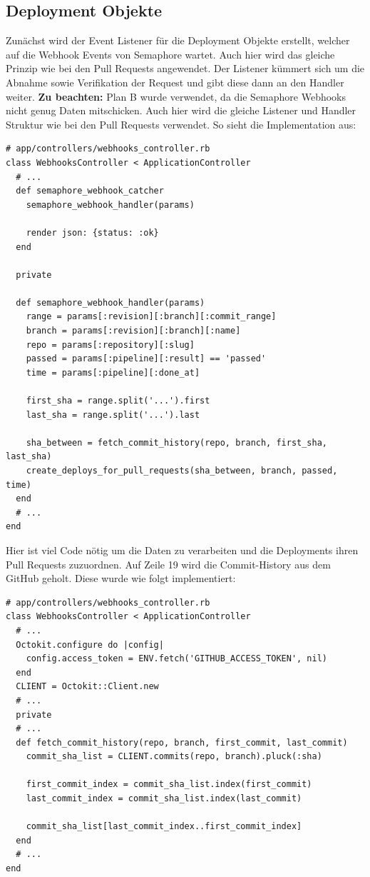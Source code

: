 \subsection{Deployment Objekte}
Zunächst wird der Event Listener für die Deployment Objekte erstellt, welcher auf die Webhook Events von Semaphore
wartet. Auch hier wird das gleiche Prinzip wie bei den Pull Requests angewendet. Der Listener kümmert sich um die
Abnahme sowie Verifikation der Request und gibt diese dann an den Handler weiter. \newline
\textbf{Zu beachten:} Plan B wurde verwendet, da die Semaphore Webhooks nicht genug Daten mitschicken. \newline
Auch hier wird die gleiche Listener und Handler Struktur wie bei den Pull Requests verwendet. So sieht die
Implementation aus:
\begin{codebox}[]
  \begin{verbatim}
# app/controllers/webhooks_controller.rb
class WebhooksController < ApplicationController
  # ...
  def semaphore_webhook_catcher
    semaphore_webhook_handler(params)

    render json: {status: :ok}
  end

  private

  def semaphore_webhook_handler(params)
    range = params[:revision][:branch][:commit_range]
    branch = params[:revision][:branch][:name]
    repo = params[:repository][:slug]
    passed = params[:pipeline][:result] == 'passed'
    time = params[:pipeline][:done_at]

    first_sha = range.split('...').first
    last_sha = range.split('...').last

    sha_between = fetch_commit_history(repo, branch, first_sha, last_sha)
    create_deploys_for_pull_requests(sha_between, branch, passed, time)
  end
  # ...
end
  \end{verbatim}
\end{codebox}
Hier ist viel Code nötig um die Daten zu verarbeiten und die Deployments ihren Pull Requests zuzuordnen. Auf Zeile 19
wird die Commit-History aus dem GitHub geholt. Diese wurde wie folgt implementiert:
\begin{codebox}[]
  \begin{verbatim}
# app/controllers/webhooks_controller.rb
class WebhooksController < ApplicationController
  # ...
  Octokit.configure do |config|
    config.access_token = ENV.fetch('GITHUB_ACCESS_TOKEN', nil)
  end
  CLIENT = Octokit::Client.new
  # ...
  private
  # ...
  def fetch_commit_history(repo, branch, first_commit, last_commit)
    commit_sha_list = CLIENT.commits(repo, branch).pluck(:sha)

    first_commit_index = commit_sha_list.index(first_commit)
    last_commit_index = commit_sha_list.index(last_commit)

    commit_sha_list[last_commit_index..first_commit_index]
  end
  # ...
end
  \end{verbatim}
\end{codebox}
